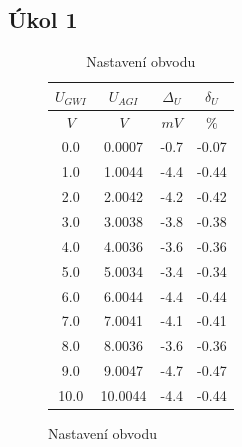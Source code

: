 \documentclass{article}
\begin{document}
\subsection*{Úkol 1}
\begin{figure}[H]
    \begin{minipage}[t]{0.4\textwidth}
        \begin{table}[H]
            \vspace{-75mm}
            \begin{tabular}{|c|c|c|c|}
            \hline
                \(U_{GWI}\)        &	\(U_{AGI}\)            &	\(\Delta_U\)        & \(\delta_U\)       \\ \hline
                \(V\)              &    \(V\)                  &	\(mV\)              & \(\%\) \\ \hline
                 0.0               &    0.0007	               &    -0.7                & -0.07 \\ \hline
                 1.0               &    1.0044	               &    -4.4                & -0.44 \\ \hline
                 2.0               &    2.0042	               &    -4.2                & -0.42 \\ \hline
                 3.0               &    3.0038	               &    -3.8                & -0.38 \\ \hline
                 4.0               &    4.0036	               &    -3.6                & -0.36 \\ \hline
                 5.0               &    5.0034	               &    -3.4                & -0.34 \\ \hline
                 6.0               &    6.0044	               &    -4.4                & -0.44 \\ \hline
                 7.0               &    7.0041	               &    -4.1                & -0.41 \\ \hline
                 8.0               &    8.0036	               &    -3.6                & -0.36 \\ \hline
                 9.0               &    9.0047	               &    -4.7                & -0.47 \\ \hline
                10.0               &    10.0044                &	-4.4                & -0.44 \\ \hline
            \end{tabular}
            \caption{\label{tab_pracovni_bod} Nastavení obvodu}
        \end{table}

\end{minipage}
\end{figure}
\end{document}
